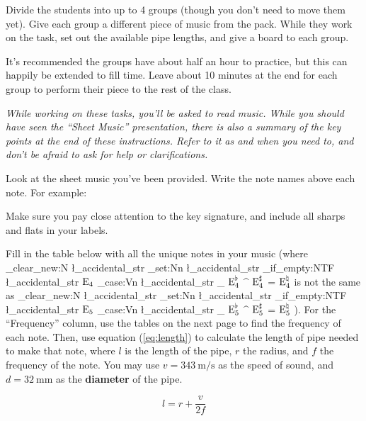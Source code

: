 \documentclass{article}
\newcommand{\notename}[3][]{
    \str_clear_new:N \l_accidental_str%
    \str_set:Nn \l_accidental_str {#1}%
    \str_if_empty:NTF \l_accidental_str {
        \ensuremath{\text{#2}\sb{#3}}%
    }{
        \str_case:Vn \l_accidental_str {%
            {_} {\ensuremath{\text{#2}^{\flat}\sb{#3}}}%
            {^} {\ensuremath{\text{#2}^{\sharp}\sb{#3}}}%
            {=} {\ensuremath{\text{#2}^{\natural}\sb{#3}}}%
        }
    }
}
\begin{document}

\begin{instructoronly}
    Divide the students into up to 4 groups (though you don't need to move them yet). Give each group a different piece of music from the pack. While they work on the task, set out the available pipe lengths, and give a board to each group. 

    It's recommended the groups have about half an hour to practice, but this can happily be extended to fill time. Leave about 10 minutes at the end for each group to perform their piece to the rest of the class.
\end{instructoronly}

\textit{While working on these tasks, you'll be asked to read music. While you should have seen the ``Sheet Music'' presentation, there is also a summary of the key points at the end of these instructions. Refer to it as and when you need to, and don't be afraid to ask for help or clarifications.}

\subtask{}

Look at the sheet music you've been provided. Write the note names above each note. For example:



\vspace{-1cm}
Make sure you pay close attention to the key signature, and include all sharps and flats in your labels.

\subtask{}

Fill in the table below with all the unique notes in your music (where \notename{E}{4} is not the same as \notename{E}{5}). For the ``Frequency'' column, use the tables on the next page to find the frequency of each note. Then, use equation (\ref{eq:length}) to calculate the length of pipe needed to make that note, where $l$ is the length of the pipe, $r$ the radius, and $f$ the frequency of the note. You may use $v = \SI{343}{\meter\per\second}$ as the speed of sound, and $d = \SI{32}{\milli\meter}$ as the \textbf{diameter} of the pipe.

\begin{equation}
    l = r + \frac{v}{2f} \label{eq:length}
\end{equation}

\begin{multicols}{2}
\end{multicols}
\end{document}
